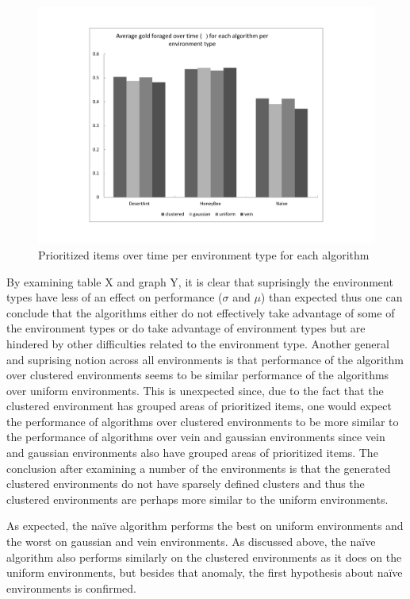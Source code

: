 \begin{figure}[!htb]
\centering
\includegraphics[width=\textwidth]{chapters/chapter6/graphs/gold_environment.pdf}
\caption{Prioritized items over time per environment type for each algorithm}
\label{environmentgoldplot}
\end{figure}
By examining table X and graph Y, it is clear that suprisingly the environment types have less of an effect on performance ($\sigma$ and $\mu$) than expected thus one can conclude that the algorithms either do not effectively take advantage of some of the environment types or do take advantage of environment types but are hindered by other difficulties related to the environment type. Another general and suprising notion across all environments is that performance of the algorithm over clustered environments seems to be similar performance of the algorithms over uniform environments. This is unexpected since, due to the fact that the clustered environment has grouped areas of prioritized items, one would expect the performance of algorithms over clustered environments to be more similar to the performance of algorithms over vein and gaussian environments since vein and gaussian environments also have grouped areas of prioritized items. The conclusion after examining a number of the environments is that the generated clustered environments do not have sparsely defined clusters and thus the clustered environments are perhaps more similar to the uniform environments. 

As expected, the na\"ive algorithm performs the best on uniform environments and the worst on gaussian and vein environments. As discussed above, the na\"ive algorithm also performs similarly on the clustered environments as it does on the uniform environments, but besides that anomaly, the first hypothesis about na\"ive environments is confirmed. 


